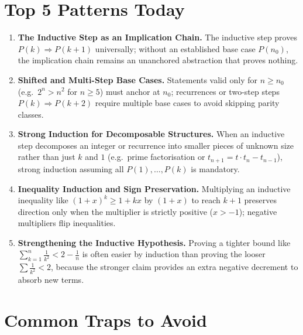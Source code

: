 \documentclass[11pt,a4paper]{article}
\begin{document}
\begin{enumerate}
\end{enumerate}

\section*{Top 5 Patterns Today}

\begin{enumerate}[leftmargin=2em, itemsep=4pt]
  \item \textbf{The Inductive Step as an Implication Chain.}
        The inductive step proves $P(k)\Rightarrow P(k+1)$ universally; without an established base case $P(n_0)$, the implication chain remains an unanchored abstraction that proves nothing. 
  \item \textbf{Shifted and Multi-Step Base Cases.}
        Statements valid only for $n\ge n_0$ (e.g.\ $2^n>n^2$ for $n\ge5$) must anchor at $n_0$; recurrences or two-step steps $P(k)\Rightarrow P(k+2)$ require multiple base cases to avoid skipping parity classes. 
  \item \textbf{Strong Induction for Decomposable Structures.}
        When an inductive step decomposes an integer or recurrence into smaller pieces of unknown size rather than just $k$ and $1$ (e.g.\ prime factorisation or $t_{n+1}=t\cdot t_n-t_{n-1}$), strong induction assuming all $P(1),\dots,P(k)$ is mandatory. 
  \item \textbf{Inequality Induction and Sign Preservation.}
        Multiplying an inductive inequality like $(1+x)^k\ge 1+kx$ by $(1+x)$ to reach $k+1$ preserves direction only when the multiplier is strictly positive ($x>-1$); negative multipliers flip inequalities. 
  \item \textbf{Strengthening the Inductive Hypothesis.}
        Proving a tighter bound like $\sum_{k=1}^n \frac{1}{k^2}<2-\frac{1}{n}$ is often easier by induction than proving the looser $\sum \frac{1}{k^2}<2$, because the stronger claim provides an extra negative decrement to absorb new terms. 
\end{enumerate}

\section*{Common Traps to Avoid}
\end{document}

